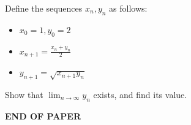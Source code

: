\documentclass{exam}
\begin{document}
\begin{questions}
    \question
    Define the sequences $x_n, y_n$ as follows:
    \begin{itemize}
        \item
        $x_0 = 1, y_0 = 2$
        \item
        $x_{n+1} = \frac{x_n + y_n}{2}$
        \item
        $y_{n+1} = \sqrt{x_{n+1}y_n}$
    \end{itemize}

    Show that $\lim_{n \to \infty} y_n$ exists, and find its value.

\end{questions}


\centering \LARGE \textbf{END OF PAPER}
\end{document}
